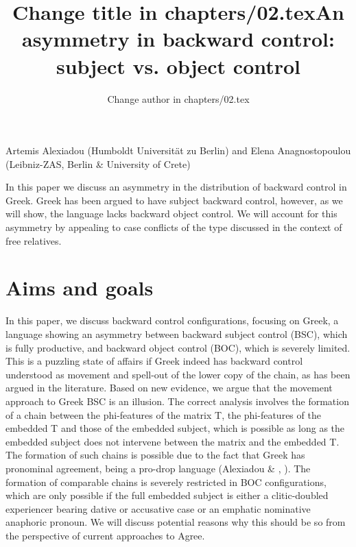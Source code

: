 \documentclass[output=paper]{langsci/langscibook}
\author{Change author in chapters/02.tex}
\title{Change title in chapters/02.tex}
\begin{document}
\title{An asymmetry in backward control: subject vs. object control}

 

 

Artemis Alexiadou (Humboldt Universität zu Berlin) and Elena Anagnostopoulou (Leibniz-ZAS, Berlin \& University of Crete)

\begin{stylelsAbstract}
In this paper we discuss an asymmetry in the distribution of backward control in Greek. Greek has been argued to have subject backward control, however, as we will show, the language lacks backward object control. We will account for this asymmetry by appealing to case conflicts of the type discussed in the context of free relatives.
\end{stylelsAbstract}

\section{ Aims and goals}

In this paper, we discuss backward control configurations, focusing on Greek, a language showing an asymmetry between backward subject control (BSC), which is fully productive, and backward object control (BOC), which is severely limited. This is a puzzling state of affairs if Greek indeed has backward control understood as movement and spell-out of the lower copy of the chain, as has been argued in the literature. Based on new evidence, we argue that the movement approach to Greek BSC is an illusion. The correct analysis involves the formation of a chain between the phi-features of the matrix T, the phi-features of the embedded T and those of the embedded subject, which is possible as long as the embedded subject does not intervene between the matrix and the embedded T. The formation of such chains is possible due to the fact that Greek has pronominal agreement, being a pro-drop language (Alexiadou \& \citealt{Anagnostopoulou1998}, \citealt{Barbosa2009}). The formation of comparable chains is severely restricted in BOC configurations, which are only possible if the full embedded subject is either a clitic-doubled experiencer bearing dative or accusative case or an emphatic nominative anaphoric pronoun. We will discuss potential reasons why this should be so from the perspective of current approaches to Agree. 
\end{document}
